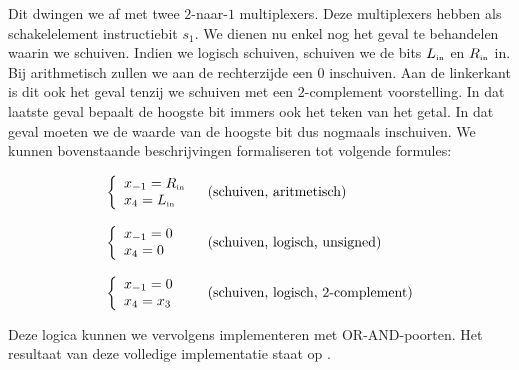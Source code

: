 Dit dwingen we af met twee $2$-naar-$1$ multiplexers. Deze multiplexers hebben als schakelelement instructiebit $s_1$. We dienen nu enkel nog het geval te behandelen waarin we schuiven. Indien we logisch schuiven, schuiven we de bits $L_{\mbox{\tiny{in}}}$ en $R_{\mbox{\tiny{in}}}$ in. Bij arithmetisch zullen we aan de rechterzijde een $0$ inschuiven. Aan de linkerkant is dit ook het geval tenzij we schuiven met een $2$-complement voorstelling. In dat laatste geval bepaalt de hoogste bit immers ook het teken van het getal. In dat geval moeten we de waarde van de hoogste bit dus nogmaals inschuiven. We kunnen bovenstaande beschrijvingen formaliseren tot volgende formules:

\begin{equation}
\begin{array}{ll}
\left\{\begin{array}{l}
x_{-1}=R_{\mbox{\tiny{in}}}\\
x_4=L_{\mbox{\tiny{in}}}
\end{array}\right.&\mbox{(schuiven, aritmetisch)}\\\\\left\{\begin{array}{l}
x_{-1}=0\\
x_4=0
\end{array}\right.&\mbox{(schuiven, logisch, unsigned)}\\\\\left\{\begin{array}{l}
x_{-1}=0\\
x_4=x_3
\end{array}\right.&\mbox{(schuiven, logisch, 2-complement)}
\end{array}
\end{equation}

Deze logica kunnen we vervolgens implementeren met OR-AND-poorten. Het resultaat van deze volledige implementatie staat op .

